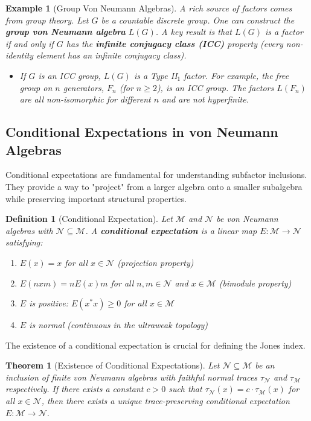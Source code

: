 \documentclass[11pt, a4paper]{article}
\theoremstyle{colored_def}
\newtheorem{definition}{Definition}[section]
\theoremstyle{colored_thm}
\newtheorem{theorem}{Theorem}[section]
\theoremstyle{colored_ex}
\newtheorem{example}{Example}[section]
\newcommand{\M}{\mathcal{M}}
\newcommand{\N}{\mathcal{N}}
\begin{document}
\begin{example}[Group Von Neumann Algebras]
A rich source of factors comes from group theory. Let $G$ be a countable discrete group. One can construct the \textbf{group von Neumann algebra} $L(G)$. A key result is that $L(G)$ is a factor if and only if $G$ has the \textbf{infinite conjugacy class (ICC)} property (every non-identity element has an infinite conjugacy class).
\begin{itemize}
    \item If $G$ is an ICC group, $L(G)$ is a Type II$_1$ factor. For example, the free group on $n$ generators, $F_n$ (for $n \geq 2$), is an ICC group. The factors $L(F_n)$ are all non-isomorphic for different $n$ and are not hyperfinite.
\end{itemize}
\end{example}

\subsection{Conditional Expectations in von Neumann Algebras}

Conditional expectations are fundamental for understanding subfactor inclusions. They provide a way to "project" from a larger algebra onto a smaller subalgebra while preserving important structural properties.

\begin{definition}[Conditional Expectation]
Let $\M$ and $\N$ be von Neumann algebras with $\N \subseteq \M$. A \textbf{conditional expectation} is a linear map $E: \M \to \N$ satisfying:
\begin{enumerate}
    \item $E(x) = x$ for all $x \in \N$ (projection property)
    \item $E(nxm) = nE(x)m$ for all $n, m \in \N$ and $x \in \M$ (bimodule property)
    \item $E$ is positive: $E(x^*x) \geq 0$ for all $x \in \M$
    \item $E$ is normal (continuous in the ultraweak topology)
\end{enumerate}
\end{definition}

The existence of a conditional expectation is crucial for defining the Jones index.

\begin{theorem}[Existence of Conditional Expectations]
Let $\N \subseteq \M$ be an inclusion of finite von Neumann algebras with faithful normal traces $\tau_\N$ and $\tau_\M$ respectively. If there exists a constant $c > 0$ such that $\tau_\N(x) = c \cdot \tau_\M(x)$ for all $x \in \N$, then there exists a unique trace-preserving conditional expectation $E: \M \to \N$.
\end{theorem}
\end{document}
